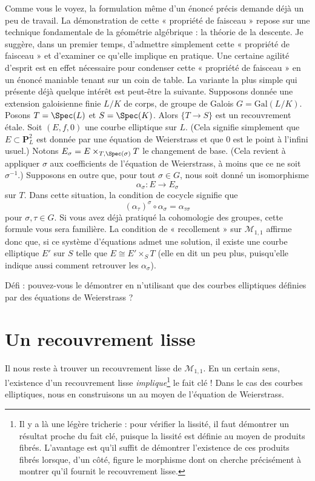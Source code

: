 \medskip\noindent
Comme vous le voyez, la formulation même d'un énoncé précis demande déjà un
peu de travail. La démonstration de cette « propriété de faisceau » repose sur
une technique fondamentale de la géométrie algébrique : la théorie de la
descente. Je suggère, dans un premier temps, d'admettre simplement cette
« propriété de faisceau » et d'examiner ce qu'elle implique en pratique.
Une certaine agilité d'esprit est en effet nécessaire pour condenser cette
« propriété de faisceau » en un énoncé maniable tenant sur un coin de table.
La variante la plus simple qui présente déjà quelque intérêt est peut-être la
suivante. Supposons donnée une extension galoisienne finie $L/K$ de corps, de
groupe de Galois $G = \text{Gal}(L/K)$. Posons $T = \Spec(L)$ et
$S = \Spec(K)$. Alors $\{T \to S\}$ est un recouvrement \'etale.
Soit $(E, f, 0)$ une courbe elliptique sur $L$. (Cela signifie simplement que
$E \subset \mathbf{P}^2_L$ est donnée par une équation de Weierstrass et que
$0$ est le point à l'infini usuel.) Notons
$E_\sigma = E \times_{T, \Spec(\sigma)} T$ le changement de base.
(Cela revient à appliquer $\sigma$ aux coefficients de l'équation de
Weierstrass, à moins que ce ne soit $\sigma^{-1}$.) Supposons en outre que,
pour tout $\sigma \in G$, nous soit donné un isomorphisme
$$
\alpha_\sigma : E \longrightarrow E_\sigma
$$
sur $T$. Dans cette situation, la condition de cocycle signifie que
$$
(\alpha_\tau)^\sigma \circ \alpha_\sigma = \alpha_{\tau\sigma}
$$
pour $\sigma, \tau \in G$. Si vous avez déjà pratiqué la cohomologie des
groupes, cette formule vous sera familière. La condition de « recollement »
sur $\mathcal{M}_{1, 1}$ affirme donc que, si ce système d'équations admet une
solution, il existe une courbe elliptique $E'$ sur $S$ telle que
$E \cong E' \times_S T$ (elle en dit un peu plus, puisqu'elle indique aussi
comment retrouver les $\alpha_\sigma$).

\medskip\noindent
Défi : pouvez-vous le démontrer en n'utilisant que des courbes elliptiques
définies par des équations de Weierstrass ?




\section{Un recouvrement lisse}
\label{section-smooth}

\noindent
Il nous reste à trouver un recouvrement lisse de $\mathcal{M}_{1, 1}$.
En un certain sens, l'existence d'un recouvrement lisse
{\it implique}\footnote{Il y a là une légère tricherie : pour vérifier la
lissité, il faut démontrer un résultat proche du fait clé, puisque la lissité
est définie au moyen de produits fibrés. L'avantage est qu'il suffit de
démontrer l'existence de ces produits fibrés lorsque, d'un côté, figure le
morphisme dont on cherche précisément à montrer qu'il fournit le recouvrement
lisse.} le fait clé ! Dans le cas des courbes elliptiques, nous en construisons
un au moyen de l'équation de Weierstrass.

